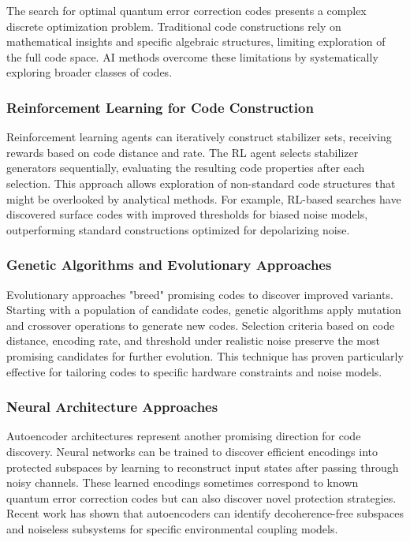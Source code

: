 The search for optimal quantum error correction codes presents a complex discrete optimization problem. Traditional code constructions rely on mathematical insights and specific algebraic structures, limiting exploration of the full code space. AI methods overcome these limitations by systematically exploring broader classes of codes.

\subsubsection{Reinforcement Learning for Code Construction}

Reinforcement learning agents can iteratively construct stabilizer sets, receiving rewards based on code distance and rate. The RL agent selects stabilizer generators sequentially, evaluating the resulting code properties after each selection. This approach allows exploration of non-standard code structures that might be overlooked by analytical methods. For example, RL-based searches have discovered surface codes with improved thresholds for biased noise models, outperforming standard constructions optimized for depolarizing noise.

\subsubsection{Genetic Algorithms and Evolutionary Approaches}

Evolutionary approaches "breed" promising codes to discover improved variants. Starting with a population of candidate codes, genetic algorithms apply mutation and crossover operations to generate new codes. Selection criteria based on code distance, encoding rate, and threshold under realistic noise preserve the most promising candidates for further evolution. This technique has proven particularly effective for tailoring codes to specific hardware constraints and noise models.

\subsubsection{Neural Architecture Approaches}

Autoencoder architectures represent another promising direction for code discovery. Neural networks can be trained to discover efficient encodings into protected subspaces by learning to reconstruct input states after passing through noisy channels. These learned encodings sometimes correspond to known quantum error correction codes but can also discover novel protection strategies. Recent work has shown that autoencoders can identify decoherence-free subspaces and noiseless subsystems for specific environmental coupling models.

